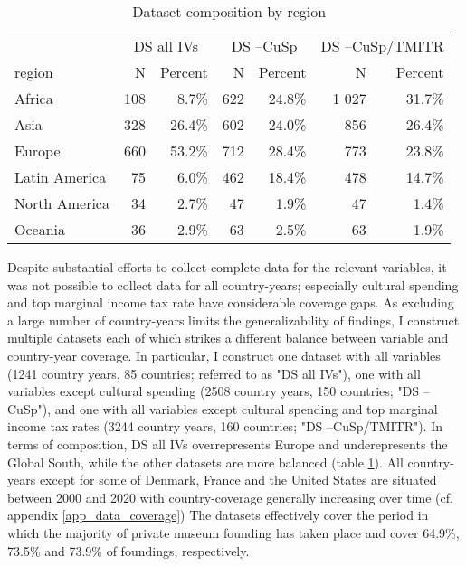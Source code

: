 \documentclass[11pt]{article}
\begin{document}
\begin{table}[ht]
\centering
\begin{tabular}{p{2.5cm}rrrrrr}
  \hline 
 & \multicolumn{2}{c}{DS all IVs} & \multicolumn{2}{c}{DS --CuSp} & \multicolumn{2}{c}{DS --CuSp/TMITR} \\ 
\cmidrule(r){2-3}\cmidrule(r){4-5}\cmidrule(r){6-7} 
 region & N & Percent & N & Percent & N & Percent \\ 
  \hline
Africa & 108 &  8.7\% & 622 & 24.8\% & 1 027 & 31.7\% \\ 
  Asia & 328 & 26.4\% & 602 & 24.0\% & 856 & 26.4\% \\ 
  Europe & 660 & 53.2\% & 712 & 28.4\% & 773 & 23.8\% \\ 
  Latin America & 75 &  6.0\% & 462 & 18.4\% & 478 & 14.7\% \\ 
  North America & 34 &  2.7\% & 47 &  1.9\% & 47 &  1.4\% \\ 
  Oceania & 36 &  2.9\% & 63 &  2.5\% & 63 &  1.9\% \\ 
   \hline
\end{tabular}
\caption{Dataset composition by region} 
\label{tbl:cbn_cpsgn}
\end{table}
Despite substantial efforts to collect complete data for the relevant variables, it was not possible to collect data for all country-years; especially cultural spending and top marginal income tax rate have considerable coverage gaps.
As excluding a large number of country-years limits the generalizability of findings, I construct multiple datasets each of which strikes a different balance between variable and country-year coverage.
In particular, I construct one dataset with all variables (1241 country years, 85 countries; referred to as "DS all IVs"), one with all variables except cultural spending (2508 country years, 150 countries; "DS --CuSp"), and one with all variables except cultural spending and top marginal income tax rates (3244 country years, 160 countries; "DS --CuSp/TMITR").
In terms of composition, DS all IVs overrepresents Europe and underepresents the Global South, while the other datasets are more balanced (table \ref{tbl:cbn_cpsgn}).
All country-years except for some of Denmark, France and the United States are situated between 2000 and 2020 with country-coverage generally increasing over time (cf. appendix \ref{app_data_coverage})
The datasets effectively cover the period in which the majority of private museum founding has taken place and cover 64.9\%, 73.5\% and 73.9\% of foundings, respectively.
\end{document}
